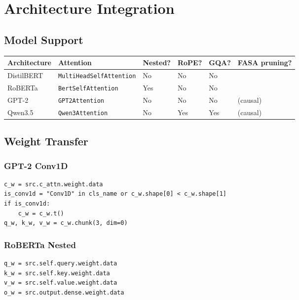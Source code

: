 
\section{Architecture Integration}

\subsection{Model Support}

\begin{table}[H]
\centering
\small
\begin{tabular}{llllll}
\toprule
\textbf{Architecture} & \textbf{Attention} & \textbf{Nested?} & \textbf{RoPE?} & \textbf{GQA?} & \textbf{FASA pruning?} \\
\midrule
DistilBERT & \texttt{MultiHeadSelfAttention} & No & No & No &  \\
RoBERTa & \texttt{BertSelfAttention} & Yes & No & No &  \\
GPT-2 & \texttt{GPT2Attention} & No & No & No & (causal) \\
Qwen3.5 & \texttt{Qwen3Attention} & No & Yes & Yes & (causal) \\
\bottomrule
\end{tabular}
\end{table}

\subsection{Weight Transfer}

\subsubsection{GPT-2 Conv1D}

\begin{lstlisting}
c_w = src.c_attn.weight.data
is_conv1d = "Conv1D" in cls_name or c_w.shape[0] < c_w.shape[1]
if is_conv1d:
    c_w = c_w.t()
q_w, k_w, v_w = c_w.chunk(3, dim=0)
\end{lstlisting}

\subsubsection{RoBERTa Nested}

\begin{lstlisting}
q_w = src.self.query.weight.data
k_w = src.self.key.weight.data
v_w = src.self.value.weight.data
o_w = src.output.dense.weight.data
\end{lstlisting}

